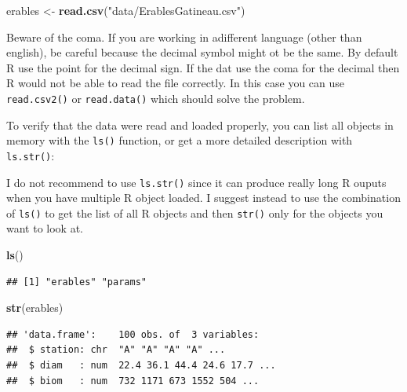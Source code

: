 \documentclass[
  12pt,
]{book}
\makeatletter
\newenvironment{Shaded}{\begin{snugshade}}{\end{snugshade}}
\newcommand{\KeywordTok}[1]{\textcolor[rgb]{0.13,0.29,0.53}{\textbf{#1}}}
\newcommand{\NormalTok}[1]{#1}
\newcommand{\StringTok}[1]{\textcolor[rgb]{0.31,0.60,0.02}{#1}}
\newenvironment{kframe}{%
\medskip{}
\setlength{\fboxsep}{.8em}
\def\at@end@of@kframe{}%
\ifinner\ifhmode%
 \def\at@end@of@kframe{\end{minipage}}%
 \begin{minipage}{\columnwidth}%
\fi\fi%
\def\FrameCommand##1{\hskip\@totalleftmargin \hskip-\fboxsep
\colorbox{incolor}{##1}\hskip-\fboxsep
    \hskip-\linewidth \hskip-\@totalleftmargin \hskip\columnwidth}%
\MakeFramed {\advance\hsize-\width
  \@totalleftmargin\z@ \linewidth\hsize
  \@setminipage}}%
{\par\unskip\endMakeFramed%
\at@end@of@kframe}
\newenvironment{rmdblock}[1]
 {
 \begin{itemize}
 \renewcommand{\labelitemi}{
   \raisebox{-.7\height}[0pt][0pt]{
     {\setkeys{Gin}{width=3em,keepaspectratio}\texttt{[image: images/\#1]}}
   }
 }
 \begin{kframe}
 \setlength{\fboxsep}{1em}
 \item
 }
 {
 \end{kframe}
 \end{itemize}
 }
\newenvironment{rmdtip}
  {\begin{rmdblock}{tip}}
  {\end{rmdblock}}
\newenvironment{rmdwarning}
  {\begin{rmdblock}{warning}}
  {\end{rmdblock}}
\makeatother
\begin{document}
\begin{Shaded}
\begin{Highlighting}[]
\NormalTok{erables \textless{}{-}}\StringTok{ }\KeywordTok{read.csv}\NormalTok{(}\StringTok{"data/ErablesGatineau.csv"}\NormalTok{)}
\end{Highlighting}
\end{Shaded}

\begin{rmdwarning}
Beware of the coma. If you are working in adifferent language (other than english), be careful because the decimal symbol might ot be the same.
By default R use the point for the decimal sign. If the dat use the coma for the decimal then R would not be able to read the file correctly. In this case you can use \texttt{read.csv2()} or \texttt{read.data()} which should solve the problem.
\end{rmdwarning}

To verify that the data were read and loaded properly, you can list all objects in memory with the \texttt{ls()} function, or get a more detailed description with \texttt{ls.str()}:

\begin{rmdtip}
I do not recommend to use \texttt{ls.str()} since it can produce really long R ouputs when you have multiple R object loaded.
I suggest instead to use the combination of \texttt{ls()} to get the list of all R objects and then \texttt{str()} only for the objects you want to look at.
\end{rmdtip}

\begin{Shaded}
\begin{Highlighting}[]
\KeywordTok{ls}\NormalTok{()}
\end{Highlighting}
\end{Shaded}

\begin{verbatim}
## [1] "erables" "params"
\end{verbatim}

\begin{Shaded}
\begin{Highlighting}[]
\KeywordTok{str}\NormalTok{(erables)}
\end{Highlighting}
\end{Shaded}

\begin{verbatim}
## 'data.frame':    100 obs. of  3 variables:
##  $ station: chr  "A" "A" "A" "A" ...
##  $ diam   : num  22.4 36.1 44.4 24.6 17.7 ...
##  $ biom   : num  732 1171 673 1552 504 ...
\end{verbatim}
\end{document}
